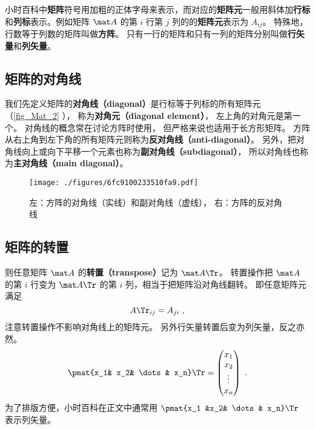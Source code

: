 
\begin{issues}
\end{issues}

小时百科中\textbf{矩阵}符号用加粗的正体字母来表示，而对应的\textbf{矩阵元}一般用斜体加\textbf{行标}和\textbf{列标}表示。例如矩阵 $\mat A$ 的第 $i$ 行第 $j$ 列的的\textbf{矩阵元}表示为 $A_{ij}$。 特殊地， 行数等于列数的矩阵叫做\textbf{方阵}。 只有一行的矩阵和只有一列的矩阵分别叫做\textbf{行矢量}和\textbf{列矢量}。

\subsection{矩阵的对角线}
我们先定义矩阵的\textbf{对角线（diagonal）}是行标等于列标的所有矩阵元（\autoref{fig_Mat_2} ）， 称为\textbf{对角元（diagonal element）}， 左上角的对角元是第一个。 对角线的概念常在讨论方阵时使用， 但严格来说也适用于长方形矩阵。 方阵从右上角到左下角的所有矩阵元则称为\textbf{反对角线（anti-diagonal）}。 另外，把对角线向上或向下平移一个元素也称为\textbf{副对角线（subdiagonal）}， 所以对角线也称为\textbf{主对角线（main diagonal）}。

\begin{figure}[ht]
\centering
\texttt{[image: ./figures/6fc9100233510fa9.pdf]}
\caption{左：方阵的对角线（实线）和副对角线（虚线）， 右：方阵的反对角线} \label{fig_Mat_2}
\end{figure}

\subsection{矩阵的转置}
则任意矩阵 $\mat A$ 的\textbf{转置（transpose）}记为 $\mat A\Tr$。 转置操作把 $\mat A$ 的第 $i$ 行变为 $\mat A\Tr$ 的第 $i$ 列，相当于把矩阵沿对角线翻转。 即任意矩阵元满足
\begin{equation}\label{eq_Mat_3}
A\Tr_{ij} = A_{ji}~,
\end{equation}
注意转置操作不影响对角线上的矩阵元。 另外行矢量转置后变为列矢量，反之亦然。
\begin{equation}\label{eq_Mat_2}
\pmat{x_1& x_2& \dots& x_n}\Tr = \begin{pmatrix} x_1\\x_2\\ \vdots\\x_n \end{pmatrix}~.
\end{equation}
为了排版方便，小时百科在正文中通常用 $\pmat{x_1 &x_2& \dots& x_n}\Tr$ 表示列矢量。

